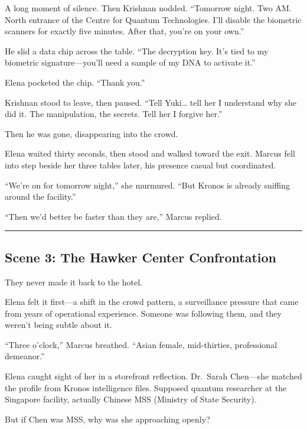 A long moment of silence. Then Krishnan nodded. ``Tomorrow night. Two AM. North entrance of the Centre for Quantum Technologies. I'll disable the biometric scanners for exactly five minutes. After that, you're on your own.''

He slid a data chip across the table. ``The decryption key. It's tied to my biometric signature---you'll need a sample of my DNA to activate it.''

Elena pocketed the chip. ``Thank you.''

Krishnan stood to leave, then paused. ``Tell Yuki\ldots{} tell her I understand why she did it. The manipulation, the secrets. Tell her I forgive her.''

Then he was gone, disappearing into the crowd.

Elena waited thirty seconds, then stood and walked toward the exit. Marcus fell into step beside her three tables later, his presence casual but coordinated.

``We're on for tomorrow night,'' she murmured. ``But Kronos is already sniffing around the facility.''

``Then we'd better be faster than they are,'' Marcus replied.

\begin{center}\rule{0.5\linewidth}{0.5pt}\end{center}

\hypertarget{scene-3-the-hawker-center-confrontation}{%
\subsection{Scene 3: The Hawker Center Confrontation}\label{scene-3-the-hawker-center-confrontation}}

They never made it back to the hotel.

Elena felt it first---a shift in the crowd pattern, a surveillance pressure that came from years of operational experience. Someone was following them, and they weren't being subtle about it.

``Three o'clock,'' Marcus breathed. ``Asian female, mid-thirties, professional demeanor.''

Elena caught sight of her in a storefront reflection. Dr.~Sarah Chen---she matched the profile from Kronos intelligence files. Supposed quantum researcher at the Singapore facility, actually Chinese MSS (Ministry of State Security).

But if Chen was MSS, why was she approaching openly?

